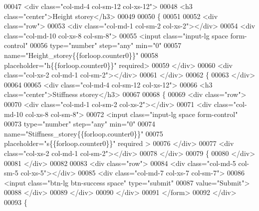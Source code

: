 \begin{DoxyCode}
00047         <div class="col-md-4 col-sm-12 col-xs-12">
00048             <h3 class="center">Height storey</h3>
00049     
00050             \{%
00051     
00052             <div class="row">
00053                 <div class="col-md-1 col-sm-2 col-xs-2"></div>
00054                 <div class="col-md-10 col-xs-8 col-sm-8">
00055                 <input class="input-lg space form-control"
00056                     type="number" step="any" min="0"
00057                     name="Height\_storey\{\{forloop.counter0\}\}"
00058                     placeholder="h\{\{forloop.counter0\}\}" required>
00059             </div>
00060                 <div class="col-xs-2 col-md-1 col-sm-2"></div>
00061             </div>
00062              \{%
00063         </div>
00064 
00065         <div class="col-md-4 col-sm-12 col-xs-12">
00066             <h3 class="center">Stiffness storey</h3>
00067     
00068             \{%
00069             <div class="row">
00070                 <div class="col-md-1 col-sm-2 col-xs-2"></div>
00071                 <div class="col-md-10 col-xs-8 col-sm-8">
00072                 <input class="input-lg space form-control"
00073                     type="number" step="any"  min="0"
00074                     name="Stiffness\_storey\{\{forloop.counter0\}\}"
00075                     placeholder="s\{\{forloop.counter0\}\}" required >
00076             </div>
00077                 <div class="col-xs-2 col-md-1 col-sm-2"></div>
00078             </div>
00079             \{%
00080         </div>
00081     </div>
00082 
00083     <div class="row">
00084         <div class="col-md-5 col-sm-5 col-xs-5"></div>
00085             <div class="col-md-7 col-xs-7 col-sm-7">
00086                 <input class="btn-lg btn-success space" type="submit" 
00087                     value="Submit">
00088             </div>
00089         </div>
00090     </div>
00091 </form>
00092 </div>
00093 \{%
\end{DoxyCode}
